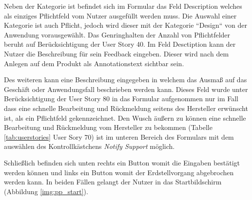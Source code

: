 Neben der Kategorie ist befindet sich im Formular das Feld Description welches als einziges Pflichtfeld vom Nutzer ausgefüllt werden muss. 
Die Auswahl einer Kategorie ist auch Pflicht,  jedoch wird dieser mit der Kategorie ``Design`` von der Anwendung vorausgewählt. Das Genringhalten der Anzahl von Pflichtfelder beruht auf  Berücksichtigung der User Story 40. Im Feld Desctiption kann der Nutzer die Beschreibung für sein Feedback eingeben. Dieser wird nach dem Anlegen auf dem Produkt als Annotationstext sichtbar sein. 
 
Des weiteren kann eine Beschreibung eingegeben in welchem das Ausmaß auf das Geschäft oder Anwendungsfall beschrieben werden kann. 
Dieses Feld wurde unter Berücksichtigung der User Story 80 in das Formular aufgenommen nur im Fall dass eine schnelle Bearbeitung und Rückmeldung seitens des Hersteller erwünscht ist, als ein Pflichtfeld gekennzeichnet. 
Den Wusch äußern zu können eine schnelle Bearbeitung und Rückmeldung vom Hersteller zu bekommen (Tabelle \ref{tab:userstories} User Sory 70) ist im unteren Bereich des Formulars mit dem auswählen des 
Kontrollkästchens \textit{Notify Support} möglich. 

Schließlich befinden sich unten rechts ein Button womit die Eingaben bestätigt werden können und links ein Button womit der Erdstellvorgang abgebrochen werden kann. In beiden Fällen gelangt der Nutzer 
in das Startbildschirm (Abbildung \ref{img:pp_start}).


